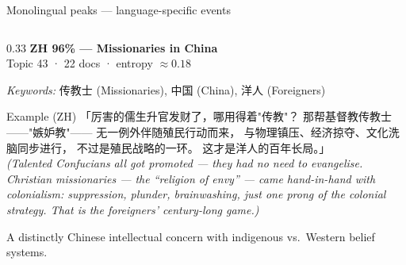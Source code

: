 \documentclass[aspectratio=169,10pt]{beamer}
\newcommand{\keyword}[1]{\textcolor{uzhblue}{\textbf{#1}}}
\begin{document}
\begin{frame}{Monolingual peaks — language-specific events}
\begin{columns}[T]
    \begin{column}{0.33\textwidth}
      \textbf{\keyword{ZH 96\%} — Missionaries in China}\\
      \textcolor{mutedgray}{\scriptsize Topic 43 · 22 docs · entropy $\approx 0.18$}
      \vspace{0.4em}

        \textit{Keywords:} 传教士 (Missionaries), 中国 (China), 洋人 (Foreigners)
      \vspace{0.5em}

      \begin{block}{Example (ZH)}
      \scriptsize
      「厉害的儒生升官发财了，哪用得着"传教"？
      那帮基督教传教士——"嫉妒教"——
      无一例外伴随殖民行动而来，
      与物理镇压、经济掠夺、文化洗脑同步进行，
      不过是殖民战略的一环。
      这才是洋人的百年长局。」\\[0.3em]
      \textcolor{mutedgray}{\textit{(Talented Confucians all got promoted — they had no need to evangelise. Christian missionaries — the ``religion of envy'' — came hand-in-hand with colonialism: suppression, plunder, brainwashing, just one prong of the colonial strategy. That is the foreigners' century-long game.)}}
      \end{block}
      \vspace{0.3em}
      \scriptsize A distinctly Chinese intellectual concern with indigenous vs.\ Western belief systems.
    \end{column}

  \end{columns}
\end{frame}
\end{document}

